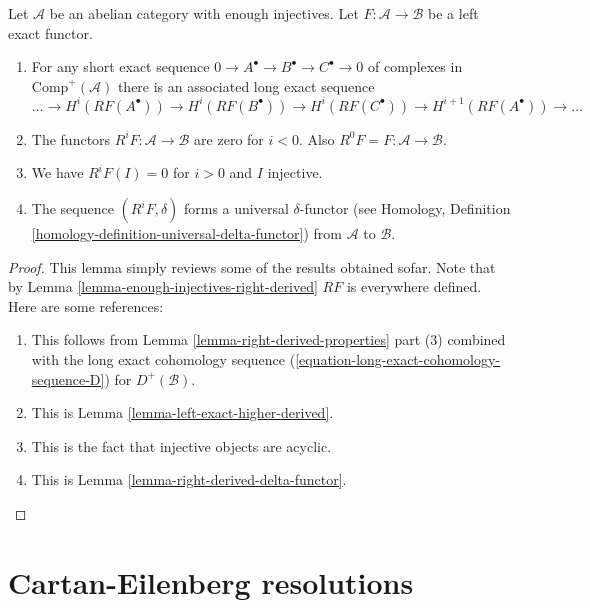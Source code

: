 \begin{lemma}
\label{lemma-higher-derived-functors}
Let $\mathcal{A}$ be an abelian category with enough injectives.
Let $F : \mathcal{A} \to \mathcal{B}$ be a left exact functor.
\begin{enumerate}
\item For any short exact sequence
$0 \to A^\bullet \to B^\bullet \to C^\bullet \to 0$
of complexes in $\text{Comp}^{+}(\mathcal{A})$ there
is an associated long exact sequence
$$
\ldots \to 
H^i(RF(A^\bullet)) \to
H^i(RF(B^\bullet)) \to
H^i(RF(C^\bullet)) \to
H^{i + 1}(RF(A^\bullet)) \to \ldots
$$
\item The functors $R^iF : \mathcal{A} \to \mathcal{B}$
are zero for $i < 0$. Also $R^0F = F : \mathcal{A} \to \mathcal{B}$.
\item We have $R^iF(I) = 0$ for $i > 0$ and $I$ injective.
\item The sequence $(R^iF, \delta)$ forms a universal $\delta$-functor (see
Homology, Definition \ref{homology-definition-universal-delta-functor})
from $\mathcal{A}$ to $\mathcal{B}$.
\end{enumerate}
\end{lemma}

\begin{proof}
This lemma simply reviews some of the results obtained sofar.
Note that by
Lemma \ref{lemma-enough-injectives-right-derived}
$RF$ is everywhere defined. Here are some references:
\begin{enumerate}
\item This follows from
Lemma \ref{lemma-right-derived-properties} part (3)
combined with the long exact cohomology sequence
(\ref{equation-long-exact-cohomology-sequence-D}) for
$D^{+}(\mathcal{B})$.
\item This is
Lemma \ref{lemma-left-exact-higher-derived}.
\item This is the fact that injective objects are acyclic.
\item This is
Lemma \ref{lemma-right-derived-delta-functor}.
\end{enumerate}
\end{proof}






\section{Cartan-Eilenberg resolutions}
\label{section-cartan-eilenberg}

